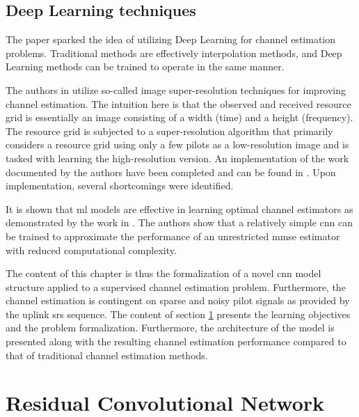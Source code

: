 \subsection{Deep Learning techniques}
The paper \cite{Soltani2019DeepEstimation} sparked the idea of utilizing Deep Learning for channel estimation problems. Traditional methods are effectively interpolation methods, and Deep Learning methods can be trained to operate in the same manner. 

The authors in \cite{Soltani2019DeepEstimation} utilize so-called image super-resolution techniques for improving channel estimation. The intuition here is that the observed and received resource grid is essentially an image consisting of a width (time) and a height (frequency). The resource grid is subjected to a super-resolution algorithm that primarily considers a resource grid using only a few pilots as a low-resolution image and is tasked with learning the high-resolution version. An implementation of the work documented by the authors have been completed and can be found in \cite{Thrane2020RepositoryLearning}. Upon implementation, several shortcomings were identified. 

It is shown that \gls{ml} models are effective in learning optimal channel estimators as demonstrated by the work in \cite{Neumann2018LearningEstimator}. The authors show that a relatively simple \gls{cnn} can be trained to approximate the performance of an unrestricted \gls{mmse} estimator with reduced computational complexity.  

The content of this chapter is thus the formalization of a novel \gls{cnn} model structure applied to a supervised channel estimation problem. Furthermore, the channel estimation is contingent on sparse and noisy pilot signals as provided by the uplink \gls{srs} sequence. The content of section \ref{sec:cnn_channel_estimator} presents the learning objectives and the problem formalization.  Furthermore, the architecture of the model is presented along with the resulting channel estimation performance compared to that of traditional channel estimation methods.


\section{Residual Convolutional Network}\label{sec:cnn_channel_estimator}

